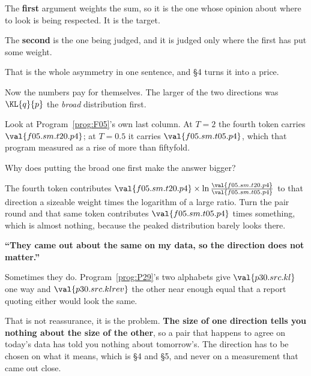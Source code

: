 \begin{fr}
\begin{ansblock}
The \textbf{first} argument weights the sum, so it is the one whose opinion
about where to look is being respected. It is the target.

The \textbf{second} is the one being judged, and it is judged only where the
first has put some weight.
\end{ansblock}

That is the whole asymmetry in one sentence, and §4 turns it into a price.
\end{fr}

\begin{fr}
Now the numbers pay for themselves. The larger of the two directions was
$\KL{q}{p}$ \dash{} the \emph{broad} distribution first.

Look at Program~\ref{prog:F05}'s own last column. At $T = 2$ the fourth token
carries $\val{f05.sm.t20.p4}$; at $T = \num{0.5}$ it carries
$\val{f05.sm.t05.p4}$, which that program measured as a rise of more than
fiftyfold.

Why does putting the broad one first make the answer bigger?
\dotline
\nextframe
\end{fr}

\begin{fr}

The fourth token contributes $\val{f05.sm.t20.p4} \times \ln\frac{
\val{f05.sm.t20.p4}}{\val{f05.sm.t05.p4}}$ to that direction \dash{} a
sizeable weight times the logarithm of a large ratio. Turn the pair round and
that same token contributes $\val{f05.sm.t05.p4}$ times something, which is
almost nothing, because the peaked distribution barely looks there.

\begin{trapbox}
\textbf{\enquote{They came out about the same on my data, so the direction
does not matter.}}

Sometimes they do. Program~\ref{prog:P29}'s two alphabets give
$\val{p30.src.kl}$ one way and $\val{p30.src.klrev}$ the other \dash{}
near enough equal that a report quoting either would look the same.

That is not reassurance, it is the problem. \textbf{The size of one direction
tells you nothing about the size of the other}, so a pair that happens to
agree on today's data has told you nothing about tomorrow's. The direction
has to be chosen on what it means, which is §4 and §5, and never on a
measurement that came out close.
\end{trapbox}
\end{fr}

